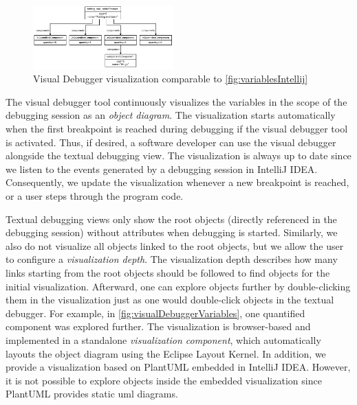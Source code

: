 \documentclass[conference]{IEEEtran}
\newcommand{\intellij}{IntelliJ IDEA}
\begin{document}
\begin{figure}[h]
    \centering
    \includegraphics[width=0.48\textwidth]{images/VD-parts list object diagram.pdf}
    \caption{Visual Debugger visualization comparable to \autoref{fig:variablesIntellij}}
    \label{fig:visualDebuggerVariables}
\end{figure}

The visual debugger tool continuously visualizes the variables in the scope of the debugging session as an \textit{object diagram}.
The visualization starts automatically when the first breakpoint is reached during debugging if the visual debugger tool is activated.
Thus, if desired, a software developer can use the visual debugger alongside the textual debugging view.
The visualization is always up to date since we listen to the events generated by a debugging session in \intellij{}.
Consequently, we update the visualization whenever a new breakpoint is reached, or a user steps through the program code.

Textual debugging views only show the root objects (directly referenced in the debugging session) without attributes when debugging is started.
Similarly, we also do not visualize all objects linked to the root objects, but we allow the user to configure a \textit{visualization depth}.
The visualization depth describes how many links starting from the root objects should be followed to find objects for the initial visualization.
Afterward, one can explore objects further by double-clicking them in the visualization just as one would double-click objects in the textual debugger.
For example, in \autoref{fig:visualDebuggerVariables}, one quantified component was explored further.
The visualization is browser-based and implemented in a standalone \textit{visualization component}, which automatically layouts the object diagram using the Eclipse Layout Kernel.
In addition, we provide a visualization based on PlantUML embedded in \intellij{}.
However, it is not possible to explore objects inside the embedded visualization since PlantUML provides static \gls*{uml} diagrams.
\end{document}

